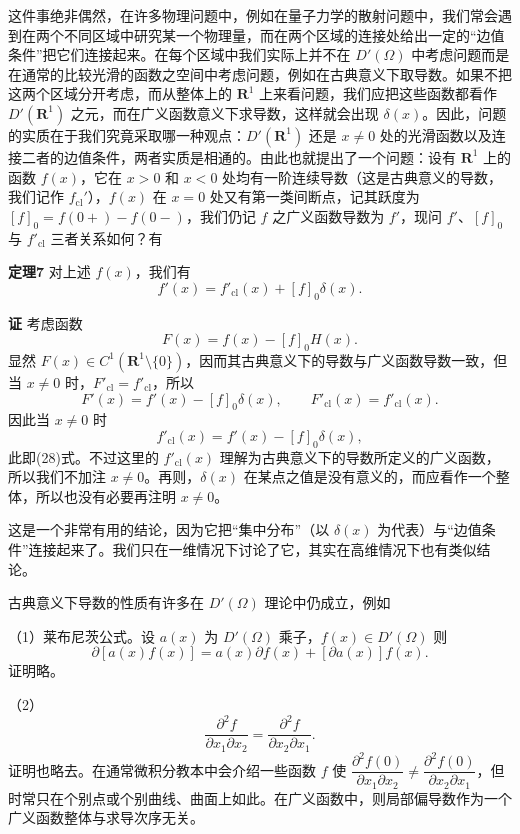 这件事绝非偶然，在许多物理问题中，例如在量子力学的散射问题中，我们常会遇到在两个不同区域中研究某一个物理量，而在两个区域的连接处给出一定的“边值条件”把它们连接起来。在每个区域中我们实际上并不在 $D'(\Omega)$ 中考虑问题而是在通常的比较光滑的函数之空间中考虑问题，例如在古典意义下取导数。如果不把这两个区域分开考虑，而从整体上的 $\mathbf R^1$ 上来看问题，我们应把这些函数都看作 $D'(\mathbf R^1)$ 之元，而在广义函数意义下求导数，这样就会出现 $\delta(x)$。因此，问题的实质在于我们究竟采取哪一种观点：$D'(\mathbf R^1)$ 还是 $x\ne0$ 处的光滑函数以及连接二者的边值条件，两者实质是相通的。由此也就提出了一个问题：设有 $\mathbf R^1$ 上的函数 $f(x)$，它在 $x>0$ 和 $x<0$ 处均有一阶连续导数（这是古典意义的导数，我们记作 $f_{\mathrm{cl}}'$），$f(x)$ 在 $x=0$ 处又有第一类间断点，记其跃度为 $[f]_0=f(0+)-f(0-)$，我们仍记 $f$ 之广义函数导数为 $f'$，现问 $f'$、$[f]_0$ 与 $f'_{\mathrm{cl}}$ 三者关系如何？有

\noindent\textbf{定理7}
对上述 $f(x)$，我们有
\begin{equation}
 f'(x)=f'_{\mathrm{cl}}(x)+[f]_0\delta(x).
 \tag{28}
\end{equation}

\noindent\textbf{证}
考虑函数
\[
 F(x)=f(x)-[f]_0H(x).
\]
显然 $F(x)\in C^1(\mathbf R^1\setminus\{0\})$，因而其古典意义下的导数与广义函数导数一致，但当 $x\ne0$ 时，$F'_{\mathrm{cl}}=f'_{\mathrm{cl}}$，所以
\[
 F'(x)=f'(x)-[f]_0\delta(x),\qquad F'_{\mathrm{cl}}(x)=f'_{\mathrm{cl}}(x).
\]
因此当 $x\ne0$ 时
\[
 f'_{\mathrm{cl}}(x)=f'(x)-[f]_0\delta(x),
\]
此即(28)式。不过这里的 $f'_{\mathrm{cl}}(x)$ 理解为古典意义下的导数所定义的广义函数，所以我们不加注 $x\ne0$。再则，$\delta(x)$ 在某点之值是没有意义的，而应看作一个整体，所以也没有必要再注明 $x\ne0$。

这是一个非常有用的结论，因为它把“集中分布”（以 $\delta(x)$ 为代表）与“边值条件”连接起来了。我们只在一维情况下讨论了它，其实在高维情况下也有类似结论。

古典意义下导数的性质有许多在 $D'(\Omega)$ 理论中仍成立，例如

（1）莱布尼茨公式。设 $a(x)$ 为 $D'(\Omega)$ 乘子，$f(x)\in D'(\Omega)$ 则
\[
 \partial[a(x)f(x)]=a(x)\partial f(x)+[\partial a(x)]f(x).
\]
证明略。

（2）
\[
 \frac{\partial^2f}{\partial x_1\partial x_2}
 =\frac{\partial^2f}{\partial x_2\partial x_1}.
\]
证明也略去。在通常微积分教本中会介绍一些函数 $f$ 使 $\dfrac{\partial^2f(0)}{\partial x_1\partial x_2}\ne\dfrac{\partial^2f(0)}{\partial x_2\partial x_1}$，但时常只在个别点或个别曲线、曲面上如此。在广义函数中，则局部偏导数作为一个广义函数整体与求导次序无关。

